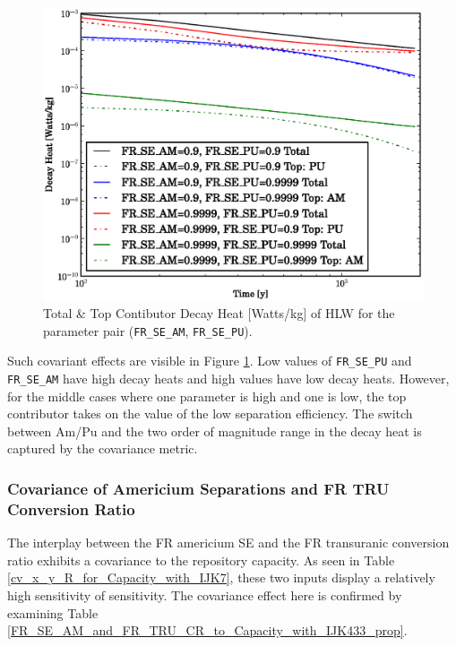 \begin{figure}[htbp]
\begin{center}
\includegraphics[scale=0.70]{ct_sensitivity/figs/FR_SE_AM_and_FR_SE_PU_Decay_Heat.eps}
\caption{Total \& Top Contibutor Decay Heat [Watts/kg] of HLW for the parameter pair (\texttt{FR\_SE\_AM}, \texttt{FR\_SE\_PU}).}
\label{am_pu_decay_heat}
\end{center}
\end{figure}

Such covariant effects are visible in Figure \ref{am_pu_decay_heat}.
Low values of \texttt{FR\_SE\_PU} and \texttt{FR\_SE\_AM} have high 
decay heats and high values have low decay heats.
However, for the middle cases where one parameter is high and one is 
low, the top contributor takes on the value of the low separation efficiency.
The switch between Am/Pu and the two order of magnitude range in the 
decay heat is captured by the covariance metric.


\subsubsection{Covariance of Americium Separations and FR TRU Conversion Ratio}
\label{cts_sec:am_se_fr_tru_cr}

The interplay between the FR americium SE and the FR transuranic conversion ratio exhibits a covariance
to the repository capacity.  As seen in Table \ref{cv_x_y_R_for_Capacity_with_IJK7}, 
these two inputs display a relatively high sensitivity of sensitivity.  
The covariance effect here is confirmed by examining 
Table \ref{FR_SE_AM_and_FR_TRU_CR_to_Capacity_with_IJK433_prop}.

